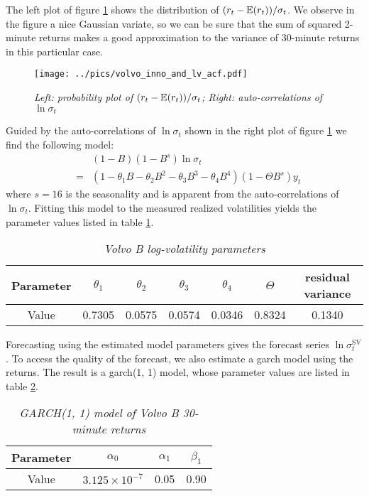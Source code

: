 The left plot of figure \ref{fig:volvo_inno_and_lv_acf} shows the
distribution of $(r_t - \mathbb{E}(r_t))/\sigma_t$. We observe in the figure a
nice Gaussian variate, so we can be sure that the sum of squared
2-minute returns makes a good approximation to the variance of
30-minute returns in this particular case.
\begin{figure}[htb!]
  \centering
  \texttt{[image: ../pics/volvo\_inno\_and\_lv\_acf.pdf]}
  \caption{\small \it Left: probability plot of $(r_t -
    \mathbb{E}(r_t))/\sigma_t$; Right: auto-correlations of $\ln \sigma_t$}
  \label{fig:volvo_inno_and_lv_acf}
\end{figure}

Guided by the auto-correlations of $\ln\sigma_t$ shown in the right
plot of figure \ref{fig:volvo_inno_and_lv_acf} we find the following
model:
\begin{eqnarray}
  && (1 - B)(1 - B^s) \ln \sigma_t \nonumber \\
  &=& (1 - \theta_1 B - \theta_2B^2 -
  \theta_3B^3 - \theta_4B^4) (1 - \Theta B^s)
  y_t \label{eq:volvo_lv_model}
\end{eqnarray}
where $s = 16$ is the seasonality and is apparent from the
auto-correlations of $\ln\sigma_t$. Fitting this model to the
measured realized volatilities yields the parameter values listed in
table
\ref{tab:volvo_params}.
\begin{table}[htb!]
  \centering
  \begin{tabular}{|c|c|c|c|c|c|c|}
    \hline
    Parameter & $\theta_1$ & $\theta_2$ & $\theta_3$ & $\theta_4$ &
    $\Theta$ & residual variance \\
    \hline
    Value & 0.7305 & 0.0575 & 0.0574 & 0.0346 & 0.8324 & 0.1340\\
    \hline
  \end{tabular}
  \caption{\small \it Volvo B log-volatility parameters}
  \label{tab:volvo_params}
\end{table}
Forecasting using the estimated model parameters gives the forecast
series $\ln \sigma^{\text{SV}}_t$. To access the quality of the
forecast, we also estimate a \gls{garch} model using the returns. The result
is a \gls{garch}(1, 1) model, whose parameter values are listed in table
\ref{tab:volvo_garch}.
\begin{table}[htb!]
  \centering
  \begin{tabular}{|c|c|c|c|}
    \hline
    Parameter & $\alpha_0$ & $\alpha_1$  & $\beta_1$ \\
    \hline
    Value & $3.125 \times 10^{-7}$ & 0.05 & 0.90 \\
    \hline
  \end{tabular}
  \caption{\small \it GARCH(1, 1) model of Volvo B 30-minute returns}
  \label{tab:volvo_garch}
\end{table}


